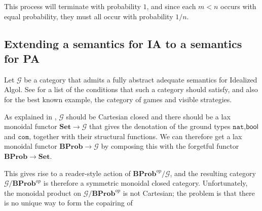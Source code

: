 \documentclass{svproc}
\newcommand\G{\mathcal{G}}
\newcommand{\nat}{{\mathtt{nat}}}
\newcommand{\0}{{\mathtt{0}}} \newcommand{\com}{{\mathtt{com}}}
\newcommand{\catname}[1]{\mathbf{#1}}
\newcommand{\Set}{\catname{Set}}
\newcommand{\BProb}{\catname{BProb}}
\newcommand{\bool}{\textsf{bool}}
\begin{document}
This process will terminate with probability $1$, and since each $m<n$ occurs with equal probability, they must all occur with probability $1/n$.

\subsection{Extending a semantics for IA to a semantics for PA}

Let $\G$ be a category that admits a fully abstract adequate semantics for Idealized Algol.  
See \cite{SamsonGuyIAPassive} for a list of the conditions that such a category should satisfy, and also for the best known example, the category of games and visible strategies.

As explained in \cite{SamsonGuyIAPassive}, $\G$ should be Cartesian closed and there should be a lax monoidal functor $\Set\to \G$ that gives the denotation of the ground types $\nat$,$\bool$ and $\com$, together with their structural functions.
We can therefore get a lax monoidal functor $\BProb \to \G$ by composing this with the forgetful functor $\BProb\to\Set$.

This gives rise to a reader-style action of $\BProb^{op}/\G$, and the resulting category $\G/\BProb^{op}$ is therefore a symmetric monoidal closed category.  
Unfortunately, the monoidal product on $\G/\BProb^{op}$ is not Cartesian; the problem is that there is no unique way to form the copairing of 



\end{document}
